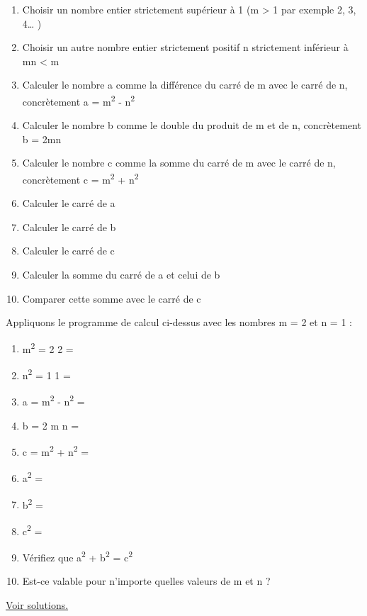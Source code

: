 \documentclass[11pt]{article}
\begin{document}
\begin{enumerate}
\item Choisir un nombre entier strictement supérieur à 1 (m > 1 par
exemple 2, 3, 4\ldots{} )
\item Choisir un autre nombre entier strictement positif n
strictement inférieur à m\quad n < m
\item Calculer le nombre a comme la différence du carré de m avec
le carré de n, concrètement a = m\textsuperscript{2} - n\textsuperscript{2}
\item Calculer le nombre b comme le double du produit de m et de
n, concrètement b = 2mn
\item Calculer le nombre c comme la somme du carré de m avec le
carré de n, concrètement c = m\textsuperscript{2} + n\textsuperscript{2}
\item Calculer le carré de a
\item Calculer le carré de b
\item Calculer le carré de c
\item Calculer la somme du carré de a et celui de b
\item Comparer cette somme avec le carré de c
\end{enumerate}


\newpage

Appliquons le programme de calcul ci-dessus avec les nombres m = 2
et n = 1 :



\begin{enumerate}
\item m\textsuperscript{2} = 2 \texttimes{} 2 =
\item n\textsuperscript{2} = 1 \texttimes{} 1 =
\item a = m\textsuperscript{2} - n\textsuperscript{2} =
\item b = 2 \texttimes{} m \texttimes{} n =
\item c = m\textsuperscript{2} + n\textsuperscript{2} =
\item a\textsuperscript{2} =
\item b\textsuperscript{2} =
\item c\textsuperscript{2} =
\item Vérifiez que  a\textsuperscript{2} + b\textsuperscript{2} = c\textsuperscript{2}
\item Est-ce valable pour n'importe quelles valeurs de m et n ?
\end{enumerate}



\hyperref[org340dc2e]{Voir solutions.}
\end{document}
